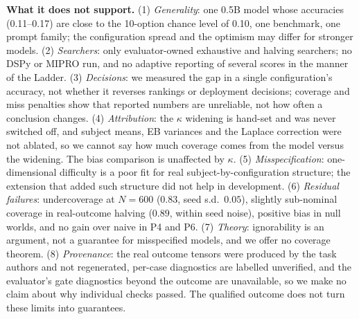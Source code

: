 \documentclass{article}
\begin{document}
\textbf{What it does not support.} (1) \emph{Generality}: one 0.5B model whose accuracies (0.11--0.17) are close to the 10-option chance level of 0.10, one benchmark, one prompt family; the configuration spread and the optimism may differ for stronger models. (2) \emph{Searchers}: only evaluator-owned exhaustive and halving searchers; no DSPy or MIPRO run, and no adaptive reporting of several scores in the manner of the Ladder. (3) \emph{Decisions}: we measured the gap in a single configuration's accuracy, not whether it reverses rankings or deployment decisions; coverage and miss penalties show that reported numbers are unreliable, not how often a conclusion changes. (4) \emph{Attribution}: the $\kappa$ widening is hand-set and was never switched off, and subject means, EB variances and the Laplace correction were not ablated, so we cannot say how much coverage comes from the model versus the widening. The bias comparison is unaffected by $\kappa$. (5) \emph{Misspecification}: one-dimensional difficulty is a poor fit for real subject-by-configuration structure; the extension that added such structure did not help in development. (6) \emph{Residual failures}: undercoverage at $N=600$ ($0.83$, seed s.d.\ $0.05$), slightly sub-nominal coverage in real-outcome halving ($0.89$, within seed noise), positive bias in null worlds, and no gain over naive in P4 and P6. (7) \emph{Theory}: ignorability is an argument, not a guarantee for misspecified models, and we offer no coverage theorem. (8) \emph{Provenance}: the real outcome tensors were produced by the task authors and not regenerated, per-case diagnostics are labelled unverified, and the evaluator's gate diagnostics beyond the outcome are unavailable, so we make no claim about why individual checks passed. The qualified outcome does not turn these limits into guarantees.
\end{document}
